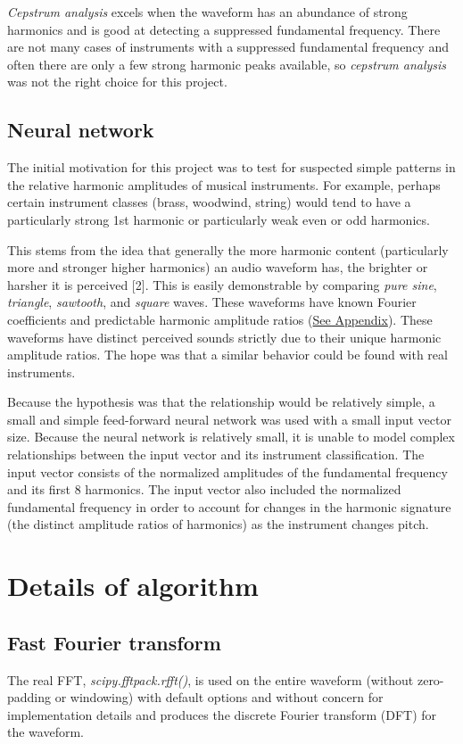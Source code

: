 \documentclass[12pt]{article}
\begin{document}
	\textit{Cepstrum analysis} excels when the waveform has an abundance of strong harmonics and is good at detecting a suppressed fundamental frequency. There are not many cases of instruments with a suppressed fundamental frequency and often there are only a few strong harmonic peaks available, so \textit{cepstrum analysis} was not the right choice for this project.

\subsection{Neural network}
	The initial motivation for this project was to test for suspected simple patterns in the relative harmonic amplitudes of musical instruments. For example, perhaps certain instrument classes (brass, woodwind, string) would tend to have a particularly strong 1st harmonic or particularly weak even or odd harmonics.
	
	This stems from the idea that generally the more harmonic content (particularly more and stronger higher harmonics) an audio waveform has, the brighter or harsher it is perceived [2]. This is easily demonstrable by comparing \textit{pure sine}, \textit{triangle}, \textit{sawtooth}, and \textit{square} waves. These waveforms have known Fourier coefficients and predictable harmonic amplitude ratios (\hyperlink{Appendix}{See Appendix}). These waveforms have distinct perceived sounds strictly due to their unique harmonic amplitude ratios. The hope was that a similar behavior could be found with real instruments.
	
	Because the hypothesis was that the relationship would be relatively simple, a small and simple feed-forward neural network was used with a small input vector size. Because the neural network is relatively small, it is unable to model complex relationships between the input vector and its instrument classification. The input vector consists of the normalized amplitudes of the fundamental frequency and its first 8 harmonics. The input vector also included the normalized fundamental frequency in order to account for changes in the harmonic signature (the distinct amplitude ratios of harmonics) as the instrument changes pitch.

\section{Details of algorithm}
\subsection{Fast Fourier transform}
The real FFT, \textit{scipy.fftpack.rfft()}, is used on the entire waveform (without zero-padding or windowing) with default options and without concern for implementation details and produces the discrete Fourier transform (DFT) for the waveform.
\end{document}
